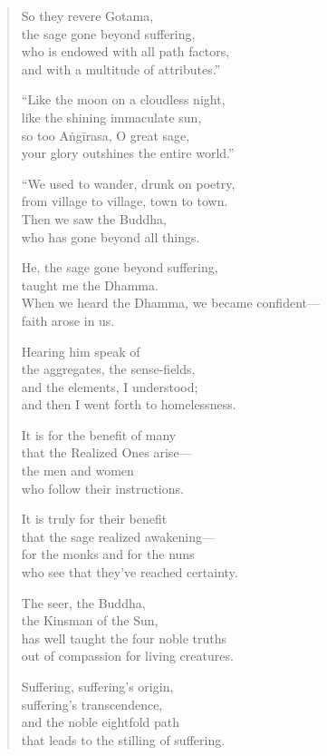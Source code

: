 \documentclass[12pt,openany]{book}%
\begin{document}
\begin{verse}
So they revere Gotama, \\
the sage gone beyond suffering, \\
who is endowed with all path factors, \\
and with a multitude of attributes.” 

“Like the moon on a cloudless night, \\
like the shining immaculate sun, \\
so too \textsanskrit{Aṅgīrasa}, O great sage, \\
your glory outshines the entire world.” 

“We used to wander, drunk on poetry, \\
from village to village, town to town. \\
Then we saw the Buddha, \\
who has gone beyond all things. 

He, the sage gone beyond suffering, \\
taught me the Dhamma. \\
When we heard the Dhamma, we became confident—\\
faith arose in us. 

Hearing him speak of \\
the aggregates, the sense-fields, \\
and the elements, I understood; \\
and then I went forth to homelessness. 

It is for the benefit of many \\
that the Realized Ones arise—\\
the men and women \\
who follow their instructions. 

It is truly for their benefit \\
that the sage realized awakening—\\
for the monks and for the nuns \\
who see that they’ve reached certainty. 

The seer, the Buddha, \\
the Kinsman of the Sun, \\
has well taught the four noble truths \\
out of compassion for living creatures. 

Suffering, suffering’s origin, \\
suffering’s transcendence, \\
and the noble eightfold path \\
that leads to the stilling of suffering. 


\end{verse}
\end{document}
